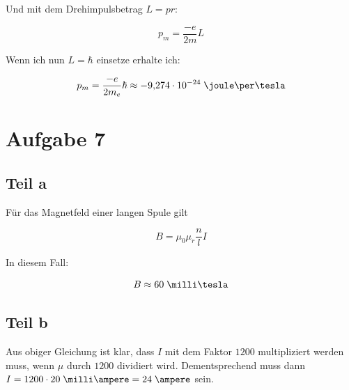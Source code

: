 \documentclass[a4paper,german,12pt,smallheadings]{scrartcl}
\begin{document}
Und mit dem Drehimpulsbetrag $L = pr$:

\begin{equation}
  p_m = \frac{-e}{2m} L
\end{equation}

Wenn ich nun $L = \hbar$ einsetze erhalte ich:

\begin{equation}
  p_m = \frac{-e}{2m_e} \hbar \approx -9{,}274 \cdot 10^{-24} \;\joule\per\tesla
\end{equation}

\section*{Aufgabe 7}
\subsection*{Teil a}
Für das Magnetfeld einer langen Spule gilt

\begin{equation}
  B = \mu_0 \mu_r \frac{n}{l} I
\end{equation}

In diesem Fall:

\begin{align*}
  B \approx 60 \;\milli\tesla
\end{align*}

\subsection*{Teil b}
Aus obiger Gleichung ist klar, dass $I$ mit dem Faktor $1200$ multipliziert
werden muss, wenn $\mu$ durch $1200$ dividiert wird. Dementsprechend muss dann
$I = 1200 \cdot 20\;\milli\ampere = 24\;\ampere$ sein.
\end{document}
